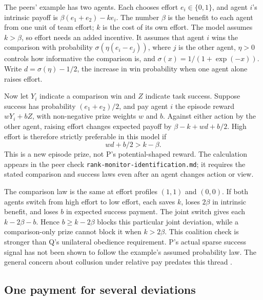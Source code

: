 \documentclass{article}
\begin{document}
The peers' example has two agents. Each chooses effort \(e_i\in\{0,1\}\), and agent \(i\)'s intrinsic payoff is
\(\beta(e_1+e_2)-ke_i\). The number \(\beta\) is the benefit to each agent from one unit of team effort; \(k\) is the
cost of its own effort. The model assumes \(k>\beta\), so effort needs an added incentive. It assumes that agent \(i\)
wins the comparison with probability \(\sigma(\eta(e_i-e_j))\), where \(j\) is the other agent, \(\eta>0\) controls
how informative the comparison is, and \(\sigma(x)=1/(1+\exp(-x))\). Write \(d=\sigma(\eta)-1/2\), the increase in win
probability when one agent alone raises effort.

Now let \(Y_i\) indicate a comparison win and \(Z\) indicate task success. Suppose success has probability
\((e_1+e_2)/2\), and pay agent \(i\) the episode reward \(wY_i+bZ\), with non-negative prize weights \(w\) and \(b\).
Against either action by the other agent, raising effort changes expected payoff by \(\beta-k+wd+b/2\). High effort is
therefore strictly preferable in this model if
\[
wd+b/2>k-\beta.
\]
This is a new episode prize, not P's potential-shaped reward. The calculation appears in the peer check
\texttt{rank-monitor-identification.md}; it requires the stated comparison and success laws even after an agent
changes action or view.

The comparison law is the same at effort profiles \((1,1)\) and \((0,0)\). If both agents switch from high effort to
low effort, each saves \(k\), loses \(2\beta\) in intrinsic benefit, and loses \(b\) in expected success payment. The
joint switch gives each \(k-2\beta-b\). Hence \(b\geq k-2\beta\) blocks this particular joint deviation, while a
comparison-only prize cannot block it when \(k>2\beta\). This coalition check is stronger than Q's unilateral
obedience requirement. P's actual sparse success signal has not been shown to follow the example's assumed probability
law. The general concern about collusion under relative pay predates this thread
\cite{gibbonsmurphy,relative2023,biasedtournaments}.

\subsection{One payment for several deviations}
\end{document}
